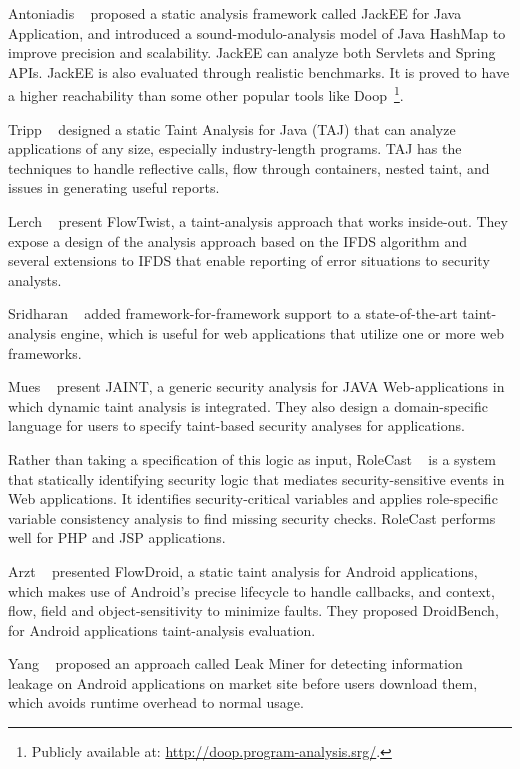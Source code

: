Antoniadis \etal~\cite{Antoniadis+etal:2020:Java} proposed a static
analysis framework called JackEE for Java Application, and introduced a
sound-modulo-analysis model of Java HashMap to improve precision and
scalability. JackEE can analyze both Servlets and Spring APIs. JackEE is also
evaluated through realistic benchmarks. It is proved to have a higher
reachability than some other popular tools like Doop~\footnote{Publicly
  available at: \url{http://doop.program-analysis.srg/}.}.

Tripp \etal~\cite{10.1145/1542476.1542486} designed a static Taint Analysis for
Java (TAJ) that can analyze applications of any size, especially industry-length
programs. TAJ has the techniques to handle reflective calls, flow through
containers, nested taint, and issues in generating useful reports.

Lerch \etal~\cite{10.1145/2635868.2635878} present FlowTwist, a taint-analysis
approach that works inside-out. They expose a design of the analysis approach
based on the IFDS algorithm and several extensions to IFDS that enable reporting
of error situations to security analysts.

Sridharan \etal~\cite{10.1145/2076021.2048145} added framework-for-framework
support to a state-of-the-art taint-analysis engine, which is useful for web
applications that utilize one or more web frameworks.

Mues \etal~\cite{10.1007/978-3-030-63461-2_7} present JAINT, a generic security
analysis for JAVA Web-applications in which dynamic taint analysis is
integrated. They also design a domain-specific language for users to specify
taint-based security analyses for applications.

Rather than taking a specification of this logic as input, RoleCast
\etal~\cite{10.1145/2048066.2048146} is a system that statically identifying
security logic that mediates security-sensitive events in Web applications. It
identifies security-critical variables and applies role-specific variable
consistency analysis to find missing security checks. RoleCast performs well for
PHP and JSP applications.

Arzt \etal~\cite{10.1145/2594291.2594299} presented FlowDroid, a static taint
analysis for Android applications, which makes use of Android's precise
lifecycle to handle callbacks, and context, flow, field and object-sensitivity
to minimize faults. They proposed DroidBench, for Android applications
taint-analysis evaluation.

Yang \etal~\cite{6394931} proposed an approach called
Leak Miner for detecting information leakage on Android applications on market
site before users download them, which avoids runtime overhead to normal usage.

